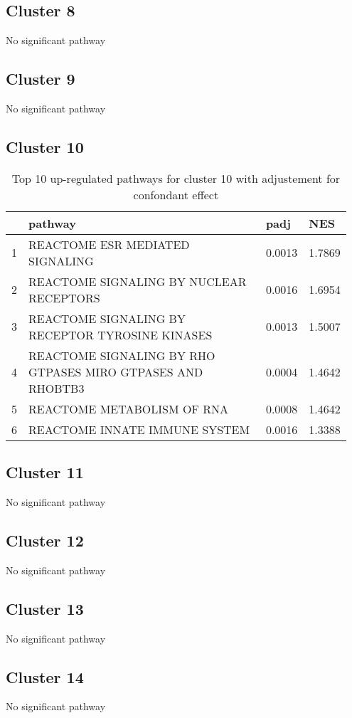 \documentclass{article}
\begin{document}
\subsection{Cluster 8 }
No significant pathway
\subsection{Cluster 9 }
No significant pathway
\subsection{Cluster 10 }
\begin{table}[H]
\centering
\begin{tabular}{p{0.05\linewidth}p{0.7\linewidth}p{0.1\linewidth}p{0.1\linewidth}}
  \hline
 & pathway & padj & NES \\ 
  \hline
1 & REACTOME ESR MEDIATED SIGNALING & 0.0013 & 1.7869 \\ 
  2 & REACTOME SIGNALING BY NUCLEAR RECEPTORS & 0.0016 & 1.6954 \\ 
  3 & REACTOME SIGNALING BY RECEPTOR TYROSINE KINASES & 0.0013 & 1.5007 \\ 
  4 & REACTOME SIGNALING BY RHO GTPASES MIRO GTPASES AND RHOBTB3 & 0.0004 & 1.4642 \\ 
  5 & REACTOME METABOLISM OF RNA & 0.0008 & 1.4642 \\ 
  6 & REACTOME INNATE IMMUNE SYSTEM & 0.0016 & 1.3388 \\ 
   \hline
\end{tabular}
\caption{Top 10 up-regulated pathways for cluster 10 with adjustement for confondant effect} 
\label{tab:q3_2_conf_10}
\end{table}
\subsection{Cluster 11 }
No significant pathway
\subsection{Cluster 12 }
No significant pathway
\subsection{Cluster 13 }
No significant pathway
\subsection{Cluster 14 }
No significant pathway
\end{document}
